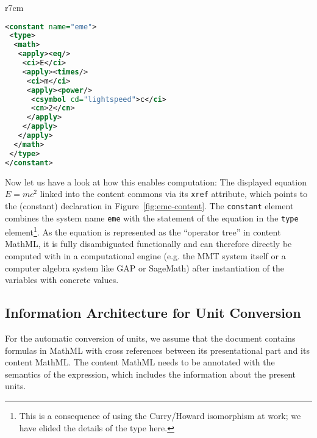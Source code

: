 \begin{wrapfigure}r{7cm}\vspace*{-.5em}
\begin{lstlisting}[language=XML,morekeywords={constant,type,apply,math,ci,cn,csymbol},basicstyle=\footnotesize\sf]
<constant name="eme">
 <type>
  <math>
   <apply><eq/>
    <ci>E</ci>
    <apply><times/>
     <ci>m</ci>
     <apply><power/>
      <csymbol cd="lightspeed">c</ci>
      <cn>2</cn>
     </apply>
    </apply>
   </apply>
  </math>     
 </type>
</constant>
\end{lstlisting}
  \caption{$E=mc^2$ in Content MathML}\label{fig:emc-content}
\end{wrapfigure}
Now let us have a look at how this enables computation: The displayed equation $E=mc^2$
linked into the content commons via its \lstinline|xref| attribute, which points to the
(constant) declaration in Figure~\ref{fig:emc-content}. The \lstinline|constant| element
combines the system name \lstinline|eme| with the statement of the equation in the
\lstinline|type| element\footnote{This is a consequence of using the Curry/Howard
  isomorphism at work; we have elided the details of the type here.}. As the equation is
represented as the ``operator tree'' in content MathML, it is fully disambiguated
functionally and can therefore directly be computed with in a computational engine
(e.g. the MMT system itself or a computer algebra system like GAP or SageMath) after
instantiation of the variables with concrete values.


\subsection{Information Architecture for Unit Conversion}
For the automatic conversion of units, we assume that the document contains formulas
in MathML with cross references between its presentational part and its content MathML. 
The content MathML needs to be annotated with the semantics of the expression, which
includes the information about the present units. 



